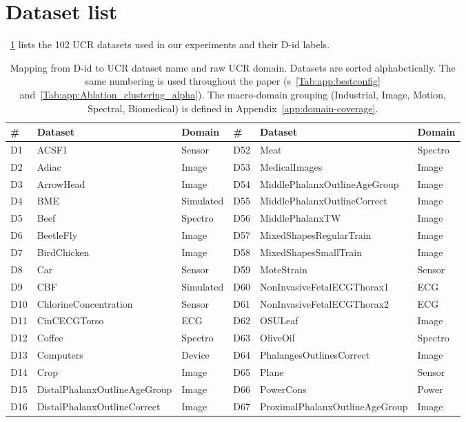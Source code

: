 \section{Dataset list}
\label{app:datasets}
\tablename~\ref{Tab:app:dataset_list} lists the 102 UCR datasets used in
our experiments and their D-id labels.
\begin{table}[H]
\centering
\caption{Mapping from D-id to UCR dataset name and raw UCR domain. Datasets are sorted alphabetically. The same numbering is used throughout the paper (\tablename s~\ref{Tab:app:bestconfig} and~\ref{Tab:app:Ablation_clustering_alpha}). The macro-domain grouping (Industrial, Image, Motion, Spectral, Biomedical) is defined in Appendix~\ref{app:domain-coverage}.}\label{Tab:app:dataset_list}
\setlength{\tabcolsep}{4pt}
\footnotesize
\begin{tabular}{lll || lll}
\toprule
\# & Dataset & Domain & \# & Dataset & Domain \\
\midrule
D1 & ACSF1 & Sensor & D52 & Meat & Spectro \\
D2 & Adiac & Image & D53 & MedicalImages & Image \\
D3 & ArrowHead & Image & D54 & MiddlePhalanxOutlineAgeGroup & Image \\
D4 & BME & Simulated & D55 & MiddlePhalanxOutlineCorrect & Image \\
D5 & Beef & Spectro & D56 & MiddlePhalanxTW & Image \\
D6 & BeetleFly & Image & D57 & MixedShapesRegularTrain & Image \\
D7 & BirdChicken & Image & D58 & MixedShapesSmallTrain & Image \\
D8 & Car & Sensor & D59 & MoteStrain & Sensor \\
D9 & CBF & Simulated & D60 & NonInvasiveFetalECGThorax1 & ECG \\
D10 & ChlorineConcentration & Sensor & D61 & NonInvasiveFetalECGThorax2 & ECG \\
D11 & CinCECGTorso & ECG & D62 & OSULeaf & Image \\
D12 & Coffee & Spectro & D63 & OliveOil & Spectro \\
D13 & Computers & Device & D64 & PhalangesOutlinesCorrect & Image \\
D14 & Crop & Image & D65 & Plane & Sensor \\
D15 & DistalPhalanxOutlineAgeGroup & Image & D66 & PowerCons & Power \\
D16 & DistalPhalanxOutlineCorrect & Image & D67 & ProximalPhalanxOutlineAgeGroup & Image \\

\end{tabular}
\end{table}
